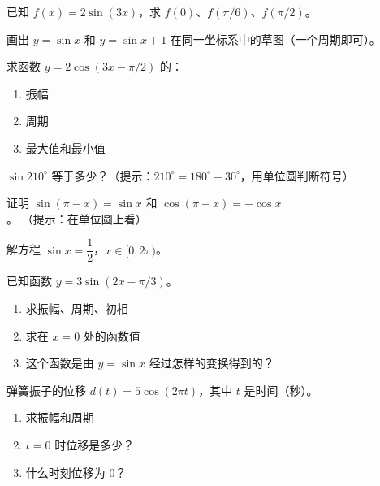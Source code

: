 \begin{exercise}[3]
已知 \(f(x) = 2\sin(3x)\)，求 \(f(0)\)、\(f(\pi/6)\)、\(f(\pi/2)\)。
\end{exercise}

\begin{exercise}[3]
画出 \(y = \sin x\) 和 \(y = \sin x + 1\) 在同一坐标系中的草图（一个周期即可）。
\end{exercise}

\begin{exercise}[3]
求函数 \(y = 2\cos(3x - \pi/2)\) 的：
\begin{enumerate}
  \item[(1)] 振幅
  \item[(2)] 周期
  \item[(3)] 最大值和最小值
\end{enumerate}
\end{exercise}

\begin{exercise}[3]
\(\sin 210^\circ\) 等于多少？（提示：\(210^\circ = 180^\circ + 30^\circ\)，用单位圆判断符号）
\end{exercise}


\begin{exercise}[4]
证明 \(\sin(\pi - x) = \sin x\) 和 \(\cos(\pi - x) = -\cos x\)。
（提示：在单位圆上看）
\end{exercise}

\begin{exercise}[4]
解方程 \(\sin x = \dfrac{1}{2}\)，\(x \in [0, 2\pi)\)。
\end{exercise}

\begin{exercise}[4]
已知函数 \(y = 3\sin(2x - \pi/3)\)。
\begin{enumerate}
  \item[(1)] 求振幅、周期、初相
  \item[(2)] 求在 \(x=0\) 处的函数值
  \item[(3)] 这个函数是由 \(y = \sin x\) 经过怎样的变换得到的？
\end{enumerate}
\end{exercise}

\begin{exercise}[4]
弹簧振子的位移 \(d(t) = 5\cos(2\pi t)\)，其中 \(t\) 是时间（秒）。
\begin{enumerate}
  \item[(1)] 求振幅和周期
  \item[(2)] \(t=0\) 时位移是多少？
  \item[(3)] 什么时刻位移为 0？
\end{enumerate}
\end{exercise}

